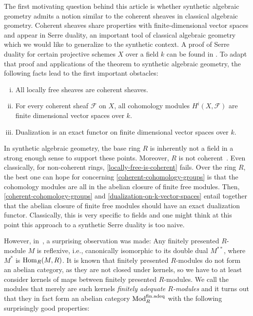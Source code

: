 The first motivating question behind this article is whether synthetic algebraic geometry admits a notion similar to the coherent sheaves in classical algebraic geometry. Coherent sheaves share properties with finite-dimensional vector spaces and appear in Serre duality, an important tool of classical algebraic geometry which we would like to generalize to the synthetic context.
A proof of Serre duality for certain projective schemes $X$ over a field $k$ can be found in \cite{Hartshorne}. To adapt that proof and applications of the theorem to synthetic algebraic geometry, the following facts lead to the first important obstacles:

\begin{enumerate}[(i)]
\item\label{locally-free-is-coherent} All locally free sheaves are coherent sheaves.
\item\label{coherent-cohomology-groups} For every coherent sheaf $\mathcal F$ on $X$, all cohomology modules $H^i(X,\mathcal F)$ are finite dimensional vector spaces over $k$.
\item\label{dualization-on-k-vector-spaces} Dualization is an exact functor on finite dimensional vector spaces over $k$.
\end{enumerate}

In synthetic algebraic geometry, the base ring $R$ is inherently not a field in a strong enough sense to support these points.
Moreover, $R$ is not coherent~\cite[Theorem~3.2.1]{topology-draft}.
Even classically, for non-coherent rings, \ref{locally-free-is-coherent} fails.
Over the ring $R$, the best one can hope for concerning \ref{coherent-cohomology-groups} is that the cohomology modules are all in the abelian closure of finite free modules.
Then, \ref{coherent-cohomology-groups} and \ref{dualization-on-k-vector-spaces} entail together that the abelian closure of finite free modules should have an exact dualization functor. Classically, this is very specific to fields and one might think at this point this approach to a synthetic Serre duality is too naive.

However, in~\cite{diffgeo-article}, a surprising observation was made:
Any finitely presented $R$-module $M$ is reflexive, i.e., canonically isomorphic to its double dual $M^{\ast\ast}$, where $M^\ast$ is $\mathrm{Hom}_R(M,R)$.
It is known that finitely presented $R$-modules do not form an abelian category, as they are not closed under kernels, so we have to at least consider kernels of maps between finitely presented $R$-modules. We call the modules that merely are such kernels \emph{finitely adequate $R$-modules} and it turns out that they in fact form an abelian category $\textup{Mod}_{R}^{\mathrm{fin.adeq}}$ with the following surprisingly good properties:


